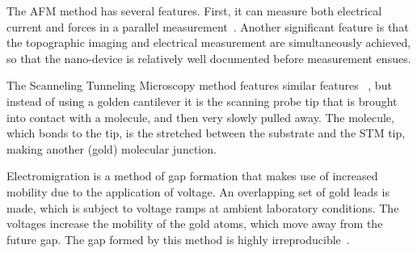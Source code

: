 The AFM method has several features. First, it can measure both electrical current and forces in a parallel measurement~\cite{nef}. Another significant feature is that the topographic imaging and electrical measurement are simultaneously achieved, so that the nano-device is relatively well documented before measurement ensues.

The Scanneling Tunneling Microscopy method features similar features ~\cite{Joachim2000}, but instead of using a golden cantilever it is the scanning probe tip that is brought into contact with a molecule, and then very slowly pulled away. The molecule, which bonds to the tip, is the stretched between the substrate and the STM tip, making another (gold) molecular junction.

Electromigration is a method of gap formation that makes use of increased mobility due to the application of voltage. An overlapping set of gold leads is made, which is subject to voltage ramps at ambient laboratory conditions. The voltages increase the mobility of the gold atoms, which move away from the future gap. The gap formed by this method is highly irreproducible~\cite{electromigration}.

